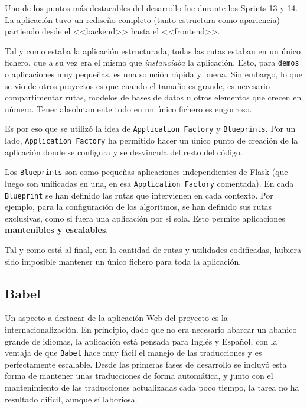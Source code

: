 Uno de los puntos más destacables del desarrollo fue durante los Sprints 13 y
14. La aplicación tuvo un rediseño completo (tanto estructura como apariencia)
partiendo desde el <<backend>> hasta el <<frontend>>.

Tal y como estaba la aplicación estructurada, todas las rutas estaban en un
único fichero, que a su vez era el mismo que \textit{instanciaba} la aplicación.
Esto, para \texttt{demos} o aplicaciones muy pequeñas, es una solución rápida y
buena. Sin embargo, lo que se vio de otros proyectos es que cuando el tamaño es
grande, es necesario compartimentar rutas, modelos de bases de datos u otros
elementos que crecen en número. Tener absolutamente todo en un único fichero es
engorroso.

Es por eso que se utilizó la idea de \texttt{Application Factory} y
\texttt{Blueprints}. Por un lado, \texttt{Application Factory} ha permitido
hacer un único punto de creación de la aplicación donde se configura y se
desvincula del resto del código.

Los \texttt{Blueprints} son como pequeñas aplicaciones independientes de Flask
(que luego son unificadas en una, en esa \texttt{Application Factory}
comentada). En cada \texttt{Blueprint} se han definido las rutas que intervienen
en cada contexto. Por ejemplo, para la configuración de los algoritmos, se han
definido sus rutas exclusivas, como si fuera una aplicación por si sola. Esto
permite aplicaciones \textbf{mantenibles y escalables}.

Tal y como está al final, con la cantidad de rutas y utilidades codificadas,
hubiera sido imposible mantener un único fichero para toda la aplicación.

\subsection{Babel}

Un aspecto a destacar de la aplicación Web del proyecto es la
internacionalización. En principio, dado que no era necesario abarcar un abanico
grande de idiomas, la aplicación está pensada para Inglés y Español, con la
ventaja de que \texttt{Babel} hace muy fácil el manejo de las traducciones y es
perfectamente escalable. Desde las primeras fases de desarrollo se incluyó esta
forma de mantener unas traducciones de forma automática, y junto con el
mantenimiento de las traducciones actualizadas cada poco tiempo, la tarea no ha
resultado difícil, aunque sí laboriosa.